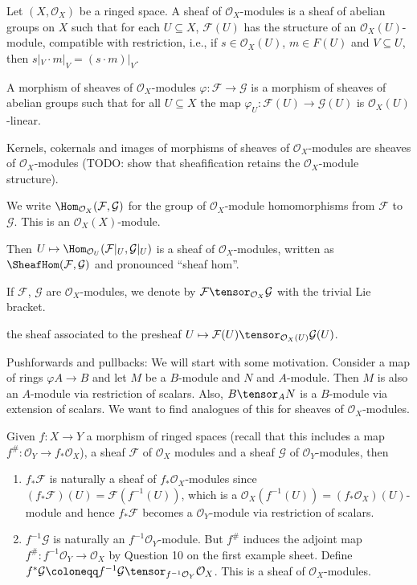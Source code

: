 Let $(X, \mathcal{O}_X)$ be a ringed space. A sheaf of  $\mathcal{O}_X$-modules
is a sheaf of abelian groups on $X$ such that for each $U \subseteq X$, $\mathcal{F}(U)$
has the structure of an $\mathcal{O}_X(U)$-module, compatible with restriction,
i.e., if $s \in \mathcal{O}_X(U)$, $m \in F(U)$ and $V \subseteq U$, then
$s|_V\cdot m|_V = (s\cdot m)|_V$.

A morphism of sheaves of $\mathcal{O}_X$-modules $\varphi\colon \mathcal{F}\to \mathcal{G}$
is a morphism of sheaves of abelian groups such that for all $U \subseteq X$
the map $\varphi_U\colon \mathcal{F}(U)\to \mathcal{G}(U)$ is $\mathcal{O}_X(U)$-linear.

Kernels, cokernals and images of morphisms of sheaves of $\mathcal{O}_X$-modules
are sheaves of $\mathcal{O}_X$-modules (TODO: show that sheafification retains the
$\mathcal{O}_X$-module structure).

We write $\Hom_{\mathcal{O}_X}(\mathcal{F}, \mathcal{G})$ for the group of
$\mathcal{O}_X$-module homomorphisms from $\mathcal{F}$ to $\mathcal{G}$.
This is an $\mathcal{O}_X(X)$-module.

Then $U\mapsto \Hom_{\mathcal{O}_U}(\mathcal{F}|_U, \mathcal{G}|_U)$ is a sheaf
of $\mathcal{O}_X$-modules, written as $\SheafHom(\mathcal{F}, \mathcal{G})$
and pronounced \enquote{sheaf hom}.

If $\mathcal{F}$, $\mathcal{G}$ are $\mathcal{O}_X$-modules, we denote by
$\mathcal{F}\tensor_{\mathcal{O}_X} \mathcal{G}$ with the trivial Lie bracket.

the sheaf associated to the
presheaf $U\mapsto \mathcal{F}(U) \tensor_{\mathcal{O}_X(U)} \mathcal{G}(U)$.

Pushforwards and pullbacks: We will start with some motivation.
Consider a map of rings $\varphi A\to B$ and let $M$ be a
$B$-module and $N$ and $A$-module. Then $M$ is also an $A$-module via restriction
of scalars. Also, $B\tensor_A N$ is a $B$-module via extension of scalars. We
want to find analogues of this for sheaves of $\mathcal{O}_X$-modules.

Given $f\colon X\to Y$ a morphism of ringed spaces (recall that this includes
a map $f^\#\colon \mathcal{O}_Y \to f_*\mathcal{O}_X$), a sheaf $\mathcal{F}$ of
$\mathcal{O}_X$ modules and a sheaf $\mathcal{G}$ of $\mathcal{O}_Y$-modules,
then
\begin{enumerate}
	\item $f_*\mathcal{F}$ is naturally a sheaf of $f_*\mathcal{O}_X$-modules since
		$(f_*\mathcal{F})(U)  = \mathcal{F}(f^{-1}(U))$, which is a
		 $\mathcal{O}_X(f^{-1}(U)) = (f_*\mathcal{O}_X)(U)$-module and hence
		 $f_*\mathcal{F}$ becomes a $\mathcal{O}_Y$-module via restriction of
		 scalars.
	\item $f^{-1}\mathcal{G}$ is naturally an $f^{-1}\mathcal{O}_Y$-module. But
		$f^\#$ induces the adjoint map $f^\#\colon f^{-1}\mathcal{O}_Y\to \mathcal{O}_X$
		by Question 10 on the first example sheet.
		Define $f^*\mathcal{G}\coloneqq f^{-1}\mathcal{G}\tensor_{f^{-1}\mathcal{O}_Y}\mathcal{O}_X$.
		This is a sheaf of $\mathcal{O}_X$-modules.
\end{enumerate}
